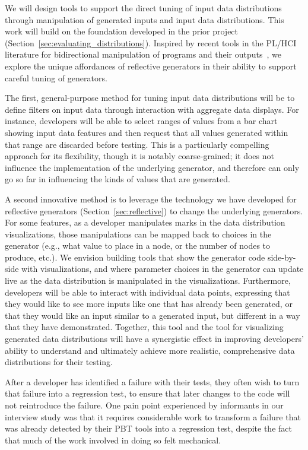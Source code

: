 We will design tools to support the direct tuning of input data distributions
through manipulation of generated inputs and input data distributions. This
work will build on the foundation developed in the prior project
(Section~\ref{sec:evaluating_distributions}). Inspired by recent tools in the PL/HCI literature
for bidirectional manipulation of programs and their
outputs~\cite{ref:hempel2019sketch,ref:kery2020mage,ref:omar2012active,ref:omar2021filling},
we explore the unique affordances of reflective generators in their ability to
support careful tuning of generators.

The first, general-purpose method for tuning input data distributions will be to
define filters on input data through interaction with aggregate data displays.
For instance, developers will be able to select ranges of values from a bar
chart showing input data features and then request that all values generated
within that range are discarded before testing. This is a particularly
compelling approach for its flexibility, though it is notably coarse-grained;
it does not influence the implementation of the underlying generator, and
therefore can only go so far in influencing the kinds of values that are
generated.

A second innovative method is to leverage the technology we have developed for
reflective generators (Section~\ref{sec:reflective}) to change the underlying
generators. For some features, as a developer manipulates marks in the data
distribution visualizations, those manipulations can be mapped back to choices
in the generator (e.g., what value to place in a node, or the number of nodes to
produce, etc.). We envision building tools that show the generator code
side-by-side with visualizations, and where parameter choices in the generator
can update live as the data distribution is manipulated in the visualizations.
Furthermore, developers will be able to interact with individual data points,
expressing that they would like to see more inputs like one that has already
been generated, or that they would like an input similar to a generated input,
but different in a way that they have demonstrated. Together, this tool and the
tool for visualizing generated data distributions will have a synergistic effect
in improving developers' ability to understand and ultimately achieve more
realistic, comprehensive data distributions for their testing.

%
After a developer has identified a failure with their tests, they
often wish to turn that failure into a regression test, to ensure that later
changes to the code will not reintroduce the failure. One pain point experienced
by informants in our interview study was that it requires considerable work to
transform a failure that was already detected by their PBT tools into a
regression test, despite the fact that much of the work involved in doing so
felt mechanical.

